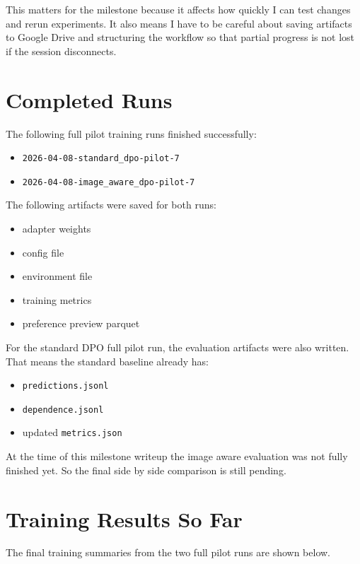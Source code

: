 \documentclass[11pt]{article}
\begin{document}
This matters for the milestone because it affects how quickly I can test changes and rerun experiments.
It also means I have to be careful about saving artifacts to Google Drive and structuring the workflow so that partial progress is not lost if the session disconnects.

\section*{Completed Runs}
The following full pilot training runs finished successfully:

\begin{itemize}
    \item \texttt{2026-04-08-standard\_dpo-pilot-7}
    \item \texttt{2026-04-08-image\_aware\_dpo-pilot-7}
\end{itemize}

The following artifacts were saved for both runs:

\begin{itemize}
    \item adapter weights
    \item config file
    \item environment file
    \item training metrics
    \item preference preview parquet
\end{itemize}

For the standard DPO full pilot run, the evaluation artifacts were also written.
That means the standard baseline already has:

\begin{itemize}
    \item \texttt{predictions.jsonl}
    \item \texttt{dependence.jsonl}
    \item updated \texttt{metrics.json}
\end{itemize}

At the time of this milestone writeup the image aware evaluation was not fully finished yet.
So the final side by side comparison is still pending.

\section*{Training Results So Far}
The final training summaries from the two full pilot runs are shown below.
\end{document}
